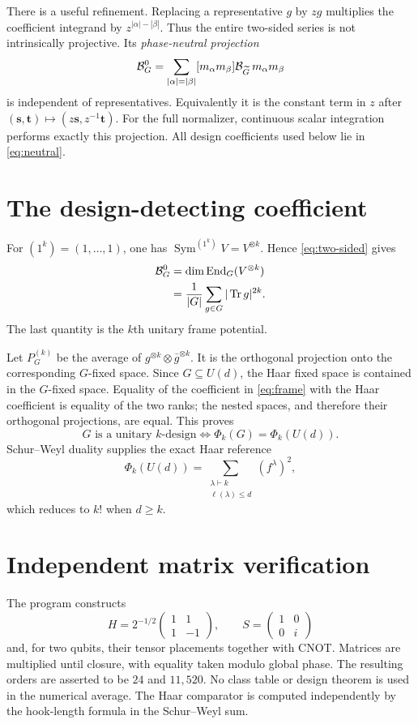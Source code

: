 \documentclass[11pt]{article}
\begin{document}
There is a useful refinement.  Replacing a representative $g$ by $zg$
multiplies the coefficient integrand by $z^{|\alpha|-|\beta|}$.  Thus the
entire two-sided series is not intrinsically projective.  Its
\emph{phase-neutral projection}
\begin{equation}\label{eq:neutral}
\mathcal B_G^0=\sum_{|\alpha|=|\beta|}
[m_\alpha m_\beta]\mathcal B_{\widetilde G}\,m_\alpha m_\beta
\end{equation}
is independent of representatives.  Equivalently it is the constant term in
$z$ after $(\mathbf s,\mathbf t)\mapsto(z\mathbf s,z^{-1}\mathbf t)$.
For the full normalizer, continuous scalar integration performs exactly this
projection.  All design coefficients used below lie in \eqref{eq:neutral}.

\section{The design-detecting coefficient}
For $(1^k)=(1,\ldots,1)$, one has
$\operatorname{Sym}^{(1^k)}V=V^{\otimes k}$.  Hence \eqref{eq:two-sided}
gives
\begin{align}
[m_{(1^k)}(\mathbf s)m_{(1^k)}(\mathbf t)]\Bmgf_G^0
&=\dim\operatorname{End}_G(V^{\otimes k})\\
&=\frac1{|G|}\sum_{g\in G}|\operatorname{Tr}g|^{2k}.
\label{eq:frame}
\end{align}
The last quantity is the $k$th unitary frame potential.

Let $P_G^{(k)}$ be the average of
$g^{\otimes k}\otimes\bar g^{\otimes k}$.  It is the orthogonal projection
onto the corresponding $G$-fixed space.  Since $G\subseteq U(d)$, the Haar
fixed space is contained in the $G$-fixed space.  Equality of the coefficient
in \eqref{eq:frame} with the Haar coefficient is equality of the two ranks;
the nested spaces, and therefore their orthogonal projections, are equal.
This proves
\[
\boxed{G\text{ is a unitary }k\text{-design}\iff
\Phi_k(G)=\Phi_k(U(d)).}
\]
Schur--Weyl duality supplies the exact Haar reference
\[
\Phi_k(U(d))=\sum_{\substack{\lambda\vdash k\\\ell(\lambda)\leq d}}
(f^\lambda)^2,
\]
which reduces to $k!$ when $d\geq k$.

\section{Independent matrix verification}
The program constructs
\[
H=2^{-1/2}\begin{pmatrix}1&1\\1&-1\end{pmatrix},\qquad
S=\begin{pmatrix}1&0\\0&i\end{pmatrix}
\]
and, for two qubits, their tensor placements together with CNOT.  Matrices
are multiplied until closure, with equality taken modulo global phase.  The
resulting orders are asserted to be $24$ and $11{,}520$.  No class table or
design theorem is used in the numerical average.  The Haar comparator is
computed independently by the hook-length formula in the Schur--Weyl sum.
\end{document}
